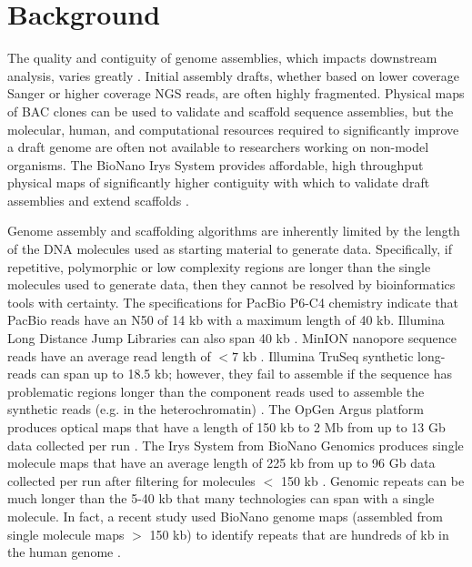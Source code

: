 \documentclass{bmcart}
\begin{document}

\section*{Background}

The quality and contiguity of genome assemblies, which impacts downstream analysis, varies greatly \cite{Gage2012,Feature-by-F2012,Assem22013}. Initial assembly drafts, whether based on lower coverage Sanger or higher coverage NGS reads, are often highly fragmented. Physical maps of BAC clones can be used to validate and scaffold sequence assemblies, but the molecular, human, and computational resources required to significantly improve a draft genome are often not available to researchers working on non-model organisms. The BioNano Irys\textregistered\textnormal{ }System provides affordable, high throughput physical maps of significantly higher contiguity with which to validate draft assemblies and extend scaffolds \cite{BioNano2010}.

Genome assembly and scaffolding algorithms are inherently limited by the length of the DNA molecules used as starting material to generate data. Specifically, if repetitive, polymorphic or low complexity regions are longer than the single molecules used to generate data, then they cannot be resolved by bioinformatics tools with certainty. The specifications for PacBio P6-C4 chemistry \cite{PacBioSpecs} indicate that PacBio reads have an N50 of 14 kb with a maximum length of 40 kb. Illumina Long Distance Jump Libraries can also span 40 kb \cite{LDJSpecs}. MinION nanopore sequence reads have an average read length of $< 7$ kb \cite{Nanopore2014}. Illumina TruSeq synthetic long-reads can span up to 18.5 kb; however, they fail to assemble if the sequence has problematic regions longer than the component reads used to assemble the synthetic reads (e.g. in the heterochromatin) \cite{Moleculo2014}. The OpGen Argus \cite{Argos2009} platform produces optical maps that have a length of 150 kb to 2 Mb from up to 13 Gb data collected per run \cite{OpgenSpecs}. The Irys System from BioNano Genomics produces single molecule maps that have an average length of 225 kb from up to 96 Gb data collected per run after filtering for molecules $<$ 150 kb \cite{BioNanoSpecs}. Genomic repeats can be much longer than the 5-40 kb that many technologies can span with a single molecule. In fact, a recent study used BioNano genome maps (assembled from single molecule maps $>$ 150 kb) to identify repeats that are hundreds of kb in the human genome \cite{BioNanoSV2014}.
\end{document}
